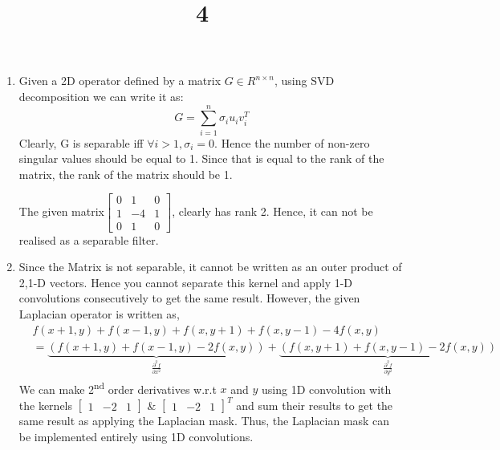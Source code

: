 \documentclass[a4paper]{article}
\title{4}
\date{}
\begin{document}
\maketitle
\begin{enumerate}[label=(\alph*)]
    \item 
Given a 2D operator defined by a matrix $G \in R^{n\times n}$, using SVD decomposition we can write it as:
\begin{equation}
    G = \sum_{i = 1}^{n} \sigma_{i}u_{i}v_{i}^T
\end{equation}
Clearly, G is separable iff $\forall i > 1, \sigma_i = 0$.
Hence the number of non-zero singular values should be equal to 1. Since that is equal to the rank of the matrix, the rank of the matrix should be 1.

The given matrix$
\begin{bmatrix}
    0 & 1 & 0 \\
    1 & -4 & 1\\
    0 & 1 & 0 
\end{bmatrix}
$, clearly has rank 2. Hence, it can not be realised as a separable filter.

\item Since the Matrix is not separable, it cannot be written as an outer product of 2,1-D vectors. Hence you cannot separate this kernel and apply 1-D convolutions consecutively to get the same result. However, the given Laplacian operator is written as,
\begin{align*}
    & f(x+1,y) + f(x-1,y) + f(x,y+1) + f(x,y-1) - 4f(x,y)\\
    & = \underbrace{(f(x+1,y) + f(x-1,y) -2f(x,y))}_{\frac{\partial^2 f}{\partial x^2}} + \underbrace{(f(x,y+1) + f(x,y-1) - 2f(x,y))}_{\frac{\partial^2 f}{\partial y^2}}
\end{align*}
We can make 2\textsuperscript{nd} order derivatives w.r.t $x$ and $y$ using 1D convolution with the kernels
$ \begin{bmatrix}1&-2&1 \end{bmatrix} $ \&
$ \begin{bmatrix}1&-2&1 \end{bmatrix}^T $ and sum their results to get the same result as applying the Laplacian mask.
Thus, the Laplacian mask can be implemented entirely using 1D convolutions.
\end{enumerate}
\end{document}
